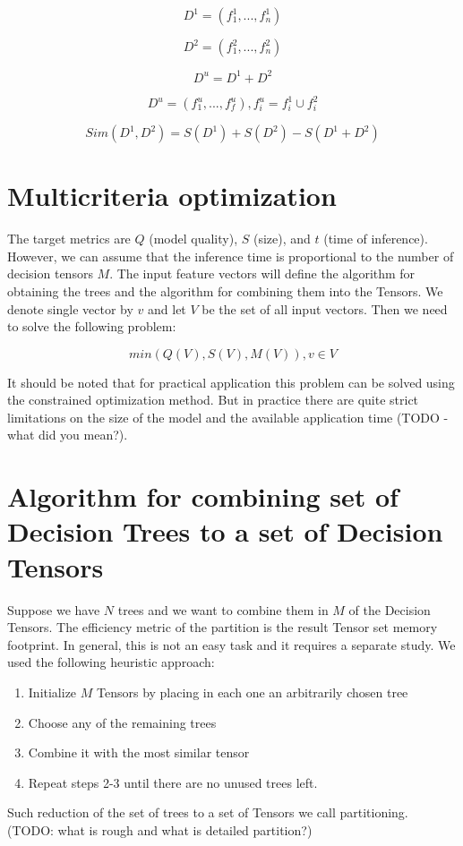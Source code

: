 \documentclass[a4paper]{jpconf}
\begin{document}
$$D^1 = (f^{1}_{1}, ..., f^{1}_{n})$$

$$D^2 = (f^{2}_{1}, ..., f^{2}_{n})$$

$$D^u = D^1 + D^2$$

$$D^u = (f^{u}_{1}, ..., f^{u}_{f}), f^{u}_{i} = f^{1}_{i} \cup f^{2}_{i}$$

$$Sim(D^1, D^2) = S(D^1) + S(D^2) - S(D^1 + D^2)$$

\section{Multicriteria optimization}

The target metrics are $ Q $ (model quality), $ S $ (size), and $ t $ (time of inference). However, we can assume that the inference time is proportional to the number of decision tensors $ M $.
The input feature vectors will define the algorithm for obtaining the trees and the algorithm for combining them into the Tensors. We denote single vector by $ v $ and let $V$ be the set of all input vectors. Then we need to solve the following problem:

$$min(Q(V), S(V), M(V)), v \in V$$

It should be noted that for practical application this problem can be solved using the constrained optimization method. But in practice there are quite strict limitations on the size of the model and the available application time (TODO - what did you mean?).

\section{Algorithm for combining set of Decision Trees to a set of Decision Tensors}

Suppose we have $N$ trees and we want to combine them in $M$ of the Decision Tensors. The efficiency metric of the partition is the result Tensor set memory footprint.
In general, this is not an easy task and it requires a separate study. We used the following heuristic approach:
\medskip
\renewcommand{\theenumi}{\arabic{enumi}}
\begin{enumerate}
\item Initialize $M$ Tensors by placing in each one an arbitrarily chosen tree
\item Choose any of the remaining trees
\item Combine it with the most similar tensor
\item Repeat steps 2-3 until there are no unused trees left.
\end{enumerate}
Such reduction of the set of trees to a set of Tensors we call partitioning.
(TODO: what is rough and what is detailed partition?)
\end{document}
